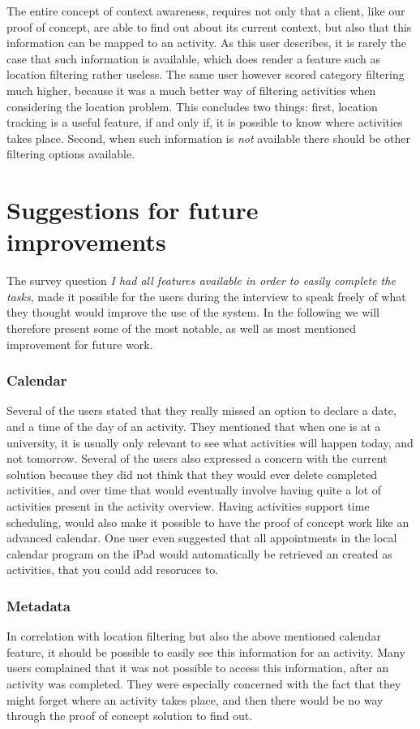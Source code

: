 The entire concept of context awareness, requires not only that a client, like our proof of concept, are able to find out about its current context, but also that this information can be mapped to an activity. As this user describes, it is rarely the case that such information is available, which does render a feature such as location filtering rather useless. The same user however scored category filtering much higher, because it was a much better way of filtering activities when considering the location problem.
This concludes two things: first, location tracking is a useful feature, if and only if, it is possible to know where activities takes place. Second, when such information is \emph{not} available there should be other filtering options available.

\section{Suggestions for future improvements}
The survey question \emph{I had all features available in order to easily complete the tasks}, made it possible for the users during the interview to speak freely of what they thought would improve the use of the system. In the following we will therefore present some of the most notable, as well as most mentioned improvement for future work.

\subsubsection{Calendar}
Several of the users stated that they really missed an option to declare a date, and a time of the day of an activity. They mentioned that when one is at a university, it is usually only relevant to see what activities will happen today, and not tomorrow. Several of the users also expressed a concern with the current solution because they did not think that they would ever delete completed activities, and over time that would eventually involve having quite a lot of activities present in the activity overview. Having activities support time scheduling, would also make it possible to have the proof of concept work like an advanced calendar. One user even suggested that all appointments in the local calendar program on the iPad would automatically be retrieved an created as activities, that you could add resoruces to.

\subsubsection{Metadata}
In correlation with location filtering but also the above mentioned calendar feature, it should be possible to easily see this information for an activity. Many users complained that it was not possible to access this information, after an activity was completed. They were especially concerned with the fact that they might forget where an activity takes place, and then there would be no way through the proof of concept solution to find out.


